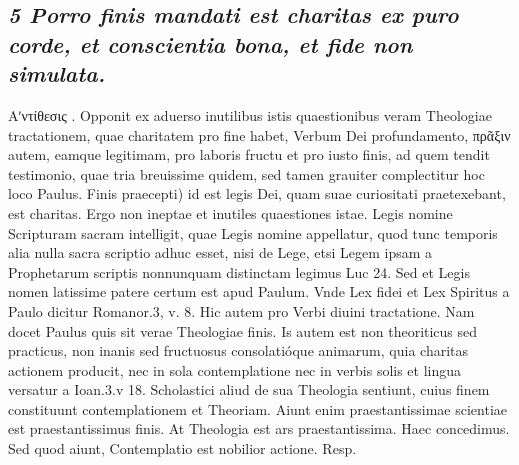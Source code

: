 \documentclass{article}
\begin{document}
\begin{pages}
\subsection*{\textit{5 Porro finis mandati est charitas ex puro corde, et conscientia bona, et fide non simulata. }}\pstart Αʹντίθεσις . Opponit ex aduerso inutilibus istis quaestionibus veram Theologiae tractationem, quae charitatem pro fine habet, Verbum Dei profundamento, πρᾶξιν autem, eamque legitimam, pro laboris fructu et pro iusto finis, ad quem tendit testimonio, quae tria breuissime quidem, sed tamen grauiter complectitur hoc loco Paulus.  \pend\pstart Finis praecepti) id est legis Dei, quam suae curiositati praetexebant, est charitas. Ergo non ineptae et inutiles quaestiones istae. Legis nomine Scripturam sacram intelligit, quae Legis nomine appellatur, quod tunc temporis alia nulla sacra scriptio adhuc esset, nisi de Lege, etsi Legem ipsam a Prophetarum scriptis nonnunquam distinctam legimus Luc 24. Sed et Legis nomen latissime patere certum est apud Paulum. Vnde Lex fidei et Lex Spiritus a Paulo dicitur Romanor.3, v. 8. Hic autem pro Verbi diuini tractatione. Nam docet Paulus quis sit verae Theologiae finis. Is autem est non theoriticus sed practicus, non inanis sed fructuosus consolatióque  animarum, quia charitas actionem producit, nec in sola contemplatione nec in verbis solis et lingua versatur a Ioan.3.v 18. Scholastici aliud de sua Theologia sentiunt, cuius finem constituunt contemplationem et Theoriam. Aiunt enim praestantissimae scientiae est praestantissimus finis. At Theologia est ars praestantissima. Haec concedimus. Sed quod aiunt,  \pend\pstart Contemplatio est nobilior actione. Resp.  \pend

\end{pages}
\end{document}
